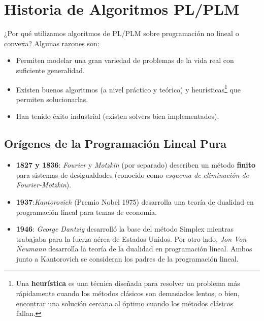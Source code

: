 \documentclass[10pt]{article}
\theoremstyle{plain}
\theoremstyle{definition}
\begin{document}
\section{Historia de Algoritmos PL/PLM}
¿Por qué utilizamos algoritmos de PL/PLM sobre programación no lineal o convexa? Algunas razones son:
\begin{itemize}
    \item Permiten modelar una gran variedad de problemas de la vida real con suficiente generalidad.
    \item Existen buenos algoritmos (a nivel práctico y teórico) y heurísticas\footnote{Una \textbf{heurística} es una técnica diseñada para resolver un problema más rápidamente cuando los métodos clásicos son demasiados lentos, o bien, encontrar una solución cercana al óptimo cuando los métodos clásicos fallan.} que permiten solucionarlas.
    \item Han tenido éxito industrial (existen solvers bien implementados).
\end{itemize}

\subsection*{Orígenes de la Programación Lineal Pura}
\begin{itemize}
    \item \textbf{1827 y 1836}: \textit{Fourier} y \textit{Motzkin} (por separado) describen un método \textbf{finito} para sistemas de desigualdades (conocido como \textit{esquema de eliminación de Fourier-Motzkin}).
    \item \textbf{1937}:\textit{Kantorovich} (Premio Nobel 1975) desarrolla una teoría de dualidad en programación lineal para temas de economía. 
    \item \textbf{1946}: \textit{George Dantzig} desarrolló la base del método Simplex mientras trabajaba para la fuerza aérea de Estados Unidos. Por otro lado, \textit{Jon Von Neumann} desarrolla la teoría de la dualidad en programación lineal.  Ambos junto a Kantorovich se consideran los padres de la programación lineal.
\end{itemize}
\end{document}

